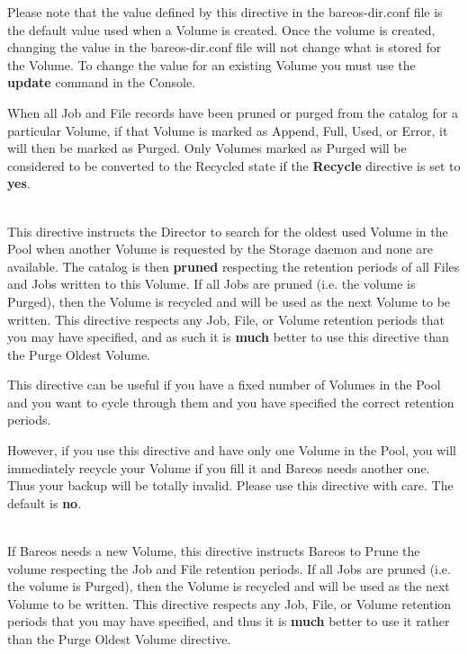 \begin{description}
Please note that the value defined by this directive in the
bareos-dir.conf file is the default value used when a Volume is created.
Once the volume is created, changing the value in the bareos-dir.conf
file will not change what is stored for the Volume.  To change the value
for an existing Volume you must use the {\bf update} command in the
Console.

When all Job and File records have been pruned or purged from the
catalog for a particular Volume, if that Volume is marked as
Append, Full, Used, or Error, it will then be marked as Purged. Only
Volumes marked as Purged will be considered to be converted to the
Recycled state if the {\bf Recycle} directive is set to {\bf yes}.

\label{RecycleOldest}
\item [Recycle Oldest Volume = {\textless}yes{\textbar}no{\textgreater}] \hfill \\
This directive instructs the Director to search for the oldest used
Volume in the Pool when another Volume is requested by the Storage
daemon and none are available.  The catalog is then {\bf pruned}
respecting the retention periods of all Files and Jobs written to this
Volume.  If all Jobs are pruned (i.e. the volume is Purged), then the
Volume is recycled and will be used as the next Volume to be written.
This directive respects any Job, File, or Volume retention periods that
you may have specified, and as such it is {\bf much} better to use this
directive than the Purge Oldest Volume.

This directive can be useful if you have a fixed number of Volumes in the
Pool and you want to cycle through them and you have specified the correct
retention periods.

However, if you use this directive and have only one
Volume in the Pool, you will immediately recycle your Volume if you fill
it and Bareos needs another one. Thus your backup will be totally invalid.
Please use this directive with care. The default is {\bf no}.

\label{RecycleCurrent}
\item [Recycle Current Volume = {\textless}yes{\textbar}no{\textgreater}] \hfill \\
If Bareos needs a new Volume, this directive instructs Bareos to Prune
the volume respecting the Job and File retention periods.  If all Jobs
are pruned (i.e.  the volume is Purged), then the Volume is recycled and
will be used as the next Volume to be written.  This directive respects
any Job, File, or Volume retention periods that you may have specified,
and thus it is {\bf much} better to use it rather than the Purge Oldest
Volume directive.


\end{description}
